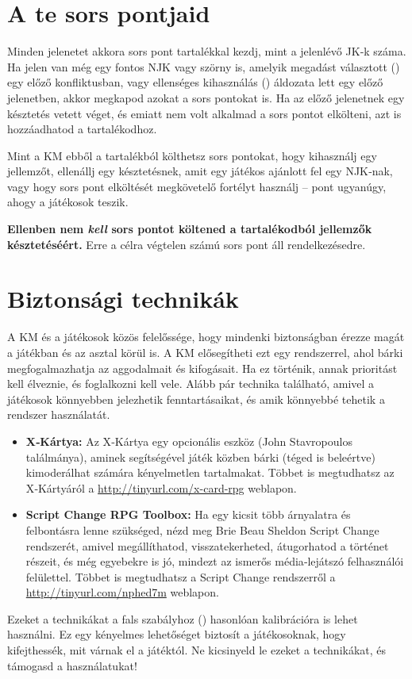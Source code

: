 \section{A te sors pontjaid}

Minden jelenetet akkora sors pont tartalékkal kezdj, mint a jelenlévő JK‑k száma. Ha jelen van még egy fontos NJK vagy szörny is, amelyik megadást választott () egy előző konfliktusban, vagy ellenséges kihasználás () áldozata lett egy előző jelenetben, akkor megkapod azokat a sors pontokat is. Ha az előző jelenetnek egy késztetés vetett véget, és emiatt nem volt alkalmad a sors pontot elkölteni, azt is hozzáadhatod a tartalékodhoz.


Mint a KM ebből a tartalékból költhetsz sors pontokat, hogy kihasználj egy jellemzőt, ellenállj egy késztetésnek, amit egy játékos ajánlott fel egy NJK‑nak, vagy hogy sors pont elköltését megkövetelő fortélyt használj – pont ugyanúgy, ahogy a játékosok teszik.

\textbf{Ellenben nem \emph{kell} sors pontot költened a tartalékodból jellemzők késztetéséért.} Erre a célra végtelen számú sors pont áll rendelkezésedre.

\section{Biztonsági technikák}

A KM és a játékosok közös felelőssége, hogy mindenki biztonságban érezze magát a játékban és az asztal körül is. A KM elősegítheti ezt egy rendszerrel, ahol bárki megfogalmazhatja az aggodalmait és kifogásait. Ha ez történik, annak prioritást kell élveznie, és foglalkozni kell vele. Alább pár technika található, amivel a játékosok könnyebben jelezhetik fenntartásaikat, és amik könnyebbé tehetik a rendszer használatát.

\begin{itemize}
    \item \textbf{X‑Kártya:} Az X‑Kártya egy opcionális eszköz (John Stavropoulos találmánya), aminek segítségével játék közben bárki (téged is beleértve) kimoderálhat számára kényelmetlen tartalmakat. Többet is megtudhatsz az X‑Kártyáról a \url{http://tinyurl.com/x-card-rpg} weblapon.
    \item \textbf{Script Change RPG Toolbox:} Ha egy kicsit több árnyalatra és felbontásra lenne szükséged, nézd meg Brie Beau Sheldon Script Change rendszerét, amivel megállíthatod, visszatekerheted, átugorhatod a történet részeit, és még egyebekre is jó, mindezt az ismerős média‑lejátszó felhasználói felülettel. Többet is megtudhatsz a Script Change rendszerről a \url{http://tinyurl.com/nphed7m} weblapon.
\end{itemize}

Ezeket a technikákat a fals szabályhoz () hasonlóan kalibrációra is lehet használni. Ez egy kényelmes lehetőséget biztosít a játékosoknak, hogy kifejthessék, mit várnak el a játéktól. Ne kicsinyeld le ezeket a technikákat, és támogasd a használatukat!
